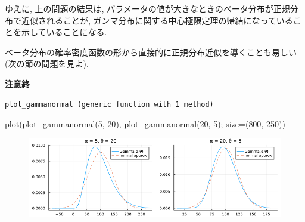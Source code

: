 \documentclass[
  letterpaper,
  DIV=11,
  numbers=noendperiod]{scrartcl}
\newenvironment{Shaded}{\begin{snugshade}}{\end{snugshade}}
\newcommand{\CommentTok}[1]{\textcolor[rgb]{0.37,0.37,0.37}{#1}}
\newcommand{\FloatTok}[1]{\textcolor[rgb]{0.68,0.00,0.00}{#1}}
\newcommand{\FunctionTok}[1]{\textcolor[rgb]{0.28,0.35,0.67}{#1}}
\newcommand{\KeywordTok}[1]{\textcolor[rgb]{0.00,0.23,0.31}{#1}}
\newcommand{\NormalTok}[1]{\textcolor[rgb]{0.00,0.23,0.31}{#1}}
\newcommand{\OperatorTok}[1]{\textcolor[rgb]{0.37,0.37,0.37}{#1}}
\newcommand{\SpecialCharTok}[1]{\textcolor[rgb]{0.37,0.37,0.37}{#1}}
\newcommand{\StringTok}[1]{\textcolor[rgb]{0.13,0.47,0.30}{#1}}
\begin{document}
ゆえに, 上の問題の結果は,
パラメータの値が大きなときのベータ分布が正規分布で近似されることが,
ガンマ分布に関する中心極限定理の帰結になっていることを示していることになる.

ベータ分布の確率密度函数の形から直接的に正規分布近似を導くことも易しい(次の節の問題を見よ).

\textbf{注意終}

\begin{Shaded}
\end{Shaded}

\begin{verbatim}
plot_gammanormal (generic function with 1 method)
\end{verbatim}

\begin{Shaded}
\begin{Highlighting}[]
\FunctionTok{plot}\NormalTok{(}\FunctionTok{plot\_gammanormal}\NormalTok{(}\FloatTok{5}\NormalTok{, }\FloatTok{20}\NormalTok{), }\FunctionTok{plot\_gammanormal}\NormalTok{(}\FloatTok{20}\NormalTok{, }\FloatTok{5}\NormalTok{); size}\OperatorTok{=}\NormalTok{(}\FloatTok{800}\NormalTok{, }\FloatTok{250}\NormalTok{))}
\end{Highlighting}
\end{Shaded}

\begin{figure}[H]

{\centering \includegraphics{05 Central limit theorem_files/figure-pdf/cell-111-output-1.png}

}

\end{figure}
\end{document}
